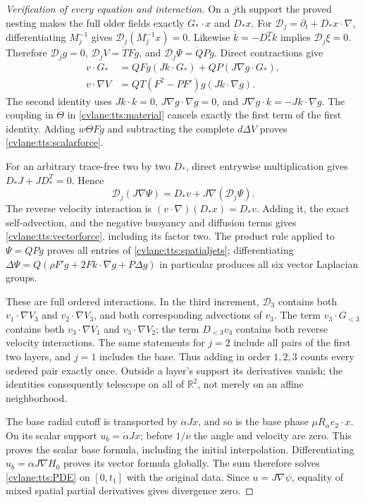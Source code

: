 \begin{proof}[Verification of every equation and interaction]
On a $j$th support the proved nesting makes the full older fields
exactly $G_*\cdot x$ and $D_*x$. For
$\mathcal D_j=\partial_t+D_*x\cdot\nabla$, differentiating
$M_j^{-1}$ gives $\mathcal D_j(M_j^{-1}x)=0$.
Likewise $\dot k=-D_*^Tk$ implies $\mathcal D_j\xi=0$.
Therefore $\mathcal D_jg=0$, $\mathcal D_jV=\dot T Fg$,
and $\mathcal D_j\Psi=\dot QPg$. Direct contractions give
\[
 \begin{split}
 v\cdot G_*&=QFg(Jk\cdot G_*)+QP(J\nabla g\cdot G_*),\\
 v\cdot\nabla V&=QT(F^2-PF')g(Jk\cdot\nabla g).
 \end{split}
\]
The second identity uses $Jk\cdot k=0$,
$J\nabla g\cdot\nabla g=0$, and
$J\nabla g\cdot k=-Jk\cdot\nabla g$.
The coupling in $\dot\Theta$ in \eqref{cvlane:tts:material}
cancels exactly the first term of the first identity. Adding
$\dot w\Theta Fg$ and subtracting the complete $d\Delta V$
proves \eqref{cvlane:tts:scalarforce}.

For an arbitrary trace-free two by two $D_*$, direct entrywise
multiplication gives $D_*J+JD_*^T=0$. Hence
\[
 \mathcal D_j(J\nabla\Psi)=D_*v+J\nabla(\mathcal D_j\Psi).
\]
The reverse velocity interaction is
$(v\cdot\nabla)(D_*x)=D_*v$. Adding it, the exact
self-advection, and the negative buoyancy and diffusion terms
gives \eqref{cvlane:tts:vectorforce}, including its factor two.
The product rule applied to $\Psi=QPg$ proves all entries of
\eqref{cvlane:tts:spatialjets}; differentiating
$\Delta\Psi=Q(\rho F'g+2Fk\cdot\nabla g+P\Delta g)$
in particular produces all six vector Laplacian groups.

These are full ordered interactions. In the third increment,
$\mathcal D_3$ contains both $v_1\cdot\nabla V_3$ and
$v_2\cdot\nabla V_3$, and both corresponding advections of
$v_3$. The term $v_3\cdot G_{<3}$ contains both
$v_3\cdot\nabla V_1$ and $v_3\cdot\nabla V_2$; the
term $D_{<3}v_3$ contains both reverse velocity interactions.
The same statements for $j=2$ include all pairs of the first
two layers, and $j=1$ includes the base. Thus adding in order
$1,2,3$ counts every ordered pair exactly once. Outside a layer's
support its derivatives vanish; the identities consequently telescope
on all of $\mathbb R^2$, not merely on an affine neighborhood.

The base radial cutoff is transported by $\dot\alpha Jx$,
and so is the base phase $\mu R_\alpha e_2\cdot x$.
On its scalar support $u_b=\dot\alpha Jx$; before $1/\nu$
the angle and velocity are zero. This proves the scalar base
formula, including the initial interpolation. Differentiating
$u_b=\dot\alpha J\nabla H_0$ proves its vector formula
globally. The sum therefore solves \eqref{cvlane:tts:PDE} on
$[0,t_1]$ with the original data. Since $u=J\nabla\psi$,
equality of mixed spatial partial derivatives gives divergence zero.
\end{proof}

